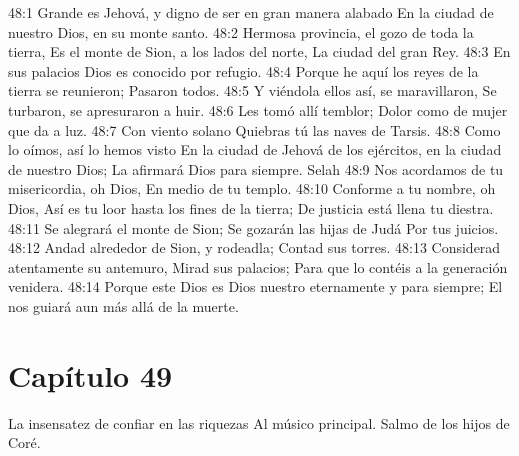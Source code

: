 48:1 Grande es Jehová, y digno de ser en gran manera alabado 
En la ciudad de nuestro Dios, en su monte santo. 
48:2 Hermosa provincia, el gozo de toda la tierra, 
Es el monte de Sion, a los lados del norte, 
La ciudad del gran Rey. 
48:3 En sus palacios Dios es conocido por refugio. 
48:4 Porque he aquí los reyes de la tierra se reunieron; 
Pasaron todos. 
48:5 Y viéndola ellos así, se maravillaron, 
Se turbaron, se apresuraron a huir. 
48:6 Les tomó allí temblor; 
Dolor como de mujer que da a luz. 
48:7 Con viento solano 
Quiebras tú las naves de Tarsis. 
48:8 Como lo oímos, así lo hemos visto 
En la ciudad de Jehová de los ejércitos, en la ciudad de nuestro Dios; 
La afirmará Dios para siempre. Selah 
48:9 Nos acordamos de tu misericordia, oh Dios, 
En medio de tu templo. 
48:10 Conforme a tu nombre, oh Dios, 
Así es tu loor hasta los fines de la tierra; 
De justicia está llena tu diestra. 
48:11 Se alegrará el monte de Sion; 
Se gozarán las hijas de Judá 
Por tus juicios. 
48:12 Andad alrededor de Sion, y rodeadla; 
Contad sus torres. 
48:13 Considerad atentamente su antemuro, 
Mirad sus palacios; 
Para que lo contéis a la generación venidera. 
48:14 Porque este Dios es Dios nuestro eternamente y para siempre; 
El nos guiará aun más allá de la muerte. 
\section*{Capítulo 49}
La insensatez de confiar en las riquezas 
Al músico principal. Salmo de los hijos de Coré. 
 
